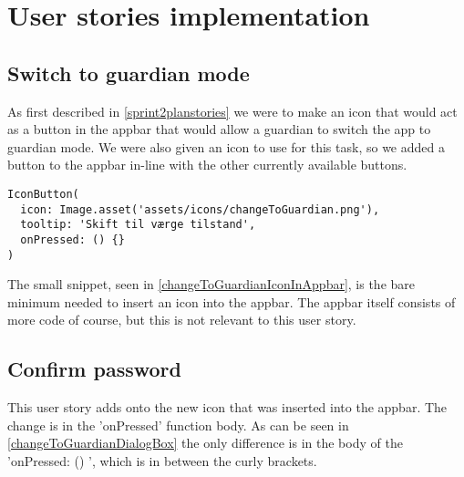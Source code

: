 \section{User stories implementation}

\subsection{Switch to guardian mode}
As first described in \autoref{sprint2planstories} we were to make an icon that would act as a button in the appbar that would allow a guardian to switch the app to guardian mode.
We were also given an icon to use for this task, so we added a button to the appbar in-line with the other currently available buttons.



\lstset{
  caption=The code used to insert the change to guardian icon in the appbar,
  label=changeToGuardianIconInAppbar
}

\begin{lstlisting}
IconButton(
  icon: Image.asset('assets/icons/changeToGuardian.png'),
  tooltip: 'Skift til værge tilstand', 
  onPressed: () {}
)
\end{lstlisting}

The small snippet, seen in \autoref{changeToGuardianIconInAppbar}, is the bare minimum needed to insert an icon into the appbar. 
The appbar itself consists of more code of course, but this is not relevant to this user story.

\subsection{Confirm password}
This user story adds onto the new icon that was inserted into the appbar. 
The change is in the 'onPressed' function body. 
As can be seen in \autoref{changeToGuardianDialogBox} the only difference is in the body of the 'onPressed: () {}', which is in between the curly brackets.

\lstset{
  caption=Dialog box for confirming password,
  label=changeToGuardianDialogBox
}

